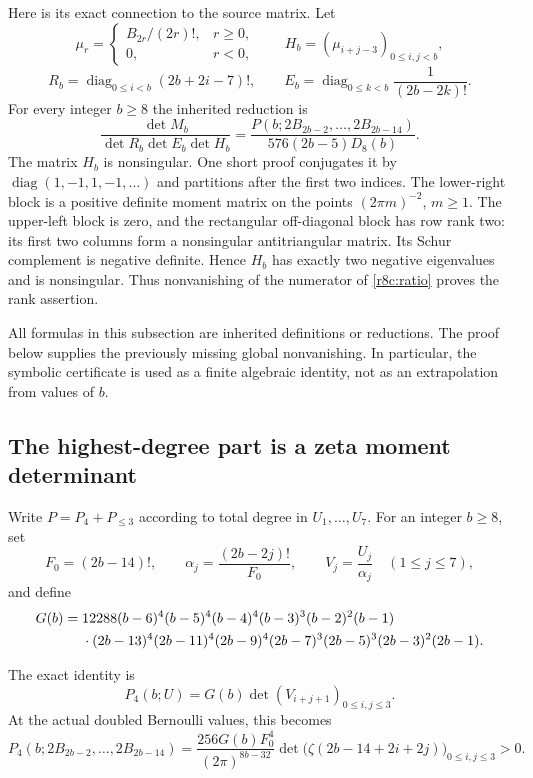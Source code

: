 Here is its exact connection to the source matrix. Let
\[
 \mu_r=\begin{cases}B_{2r}/(2r)!,&r\ge0,\\0,&r<0,\end{cases}
 \qquad H_b=(\mu_{i+j-3})_{0\le i,j<b},
\]
\[
 R_b=\operatorname{diag}_{0\le i<b}(2b+2i-7)!,\qquad
 E_b=\operatorname{diag}_{0\le k<b}\frac1{(2b-2k)!}.
\]
For every integer $b\ge8$ the inherited reduction is
\begin{equation}\label{r8c:ratio}
 \frac{\det M_b}{\det R_b\det E_b\det H_b}
 =\frac{P(b;2B_{2b-2},\ldots,2B_{2b-14})}
 {576(2b-5)D_8(b)}.
\end{equation}
The matrix $H_b$ is nonsingular. One short proof conjugates it by
$\operatorname{diag}(1,-1,1,-1,\ldots)$ and partitions after the
first two indices. The lower-right block is a positive definite
moment matrix on the points $(2\pi m)^{-2}$, $m\ge1$. The
upper-left block is zero, and the rectangular off-diagonal block
has row rank two: its first two columns form a nonsingular
antitriangular matrix. Its Schur complement is negative definite.
Hence $H_b$ has exactly two negative eigenvalues and is nonsingular.
Thus nonvanishing of the numerator of \eqref{r8c:ratio} proves the
rank assertion.

All formulas in this subsection are inherited definitions or
reductions. The proof below supplies the previously missing global
nonvanishing. In particular, the symbolic certificate is used as a
finite algebraic identity, not as an extrapolation from values of $b$.

\subsection{The highest-degree part is a zeta moment determinant}

Write $P=P_4+P_{\le3}$ according to total degree in $U_1,\ldots,U_7$.
For an integer $b\ge8$, set
\[
 F_0=(2b-14)!,\qquad
 \alpha_j=\frac{(2b-2j)!}{F_0},\qquad V_j=\frac{U_j}{\alpha_j}
       \quad(1\le j\le7),
\]
and define
\begin{align}
 G(b)={}&12288(b-6)^4(b-5)^4(b-4)^4(b-3)^3(b-2)^2(b-1)
 \notag\\
 &\cdot(2b-13)^4(2b-11)^4(2b-9)^4(2b-7)^3
 (2b-5)^3(2b-3)^2(2b-1).
 \label{r8c:G}
\end{align}

\begin{lemma}\label{r8c:hankel}
The exact identity is
\begin{equation}\label{r8c:P4}
 P_4(b;U)=G(b)\det(V_{i+j+1})_{0\le i,j\le3}.
\end{equation}
At the actual doubled Bernoulli values, this becomes
\begin{equation}\label{r8c:P4zeta}
 P_4(b;2B_{2b-2},\ldots,2B_{2b-14})
 =\frac{256G(b)F_0^4}{(2\pi)^{8b-32}}
       \det\bigl(\zeta(2b-14+2i+2j)\bigr)_{0\le i,j\le3}>0.
\end{equation}
\end{lemma}

